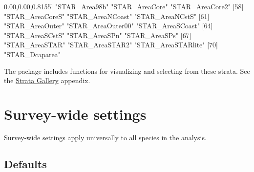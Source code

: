 \documentclass[
]{book}
\newenvironment{Shaded}{\begin{snugshade}}{\end{snugshade}}
\newcommand{\DecValTok}[1]{\textcolor[rgb]{0.00,0.00,0.81}{#1}}
\newcommand{\NormalTok}[1]{#1}
\newcommand{\StringTok}[1]{\textcolor[rgb]{0.31,0.60,0.02}{#1}}
\begin{document}
\begin{Shaded}
\begin{Highlighting}[]
\NormalTok{[}\DecValTok{55}\NormalTok{] }\StringTok{"STAR_Area98b"}       \StringTok{"STAR_AreaCore"}      \StringTok{"STAR_AreaCore2"}    
\NormalTok{[}\DecValTok{58}\NormalTok{] }\StringTok{"STAR_AreaCoreS"}     \StringTok{"STAR_AreaNCoast"}    \StringTok{"STAR_AreaNCstS"}    
\NormalTok{[}\DecValTok{61}\NormalTok{] }\StringTok{"STAR_AreaOuter"}     \StringTok{"STAR_AreaOuter00"}   \StringTok{"STAR_AreaSCoast"}   
\NormalTok{[}\DecValTok{64}\NormalTok{] }\StringTok{"STAR_AreaSCstS"}     \StringTok{"STAR_AreaSPn"}       \StringTok{"STAR_AreaSPs"}      
\NormalTok{[}\DecValTok{67}\NormalTok{] }\StringTok{"STAR_AreaSTAR"}      \StringTok{"STAR_AreaSTAR2"}     \StringTok{"STAR_AreaSTARlite"} 
\NormalTok{[}\DecValTok{70}\NormalTok{] }\StringTok{"STAR_Dcaparea"}     
\end{Highlighting}
\end{Shaded}

The package includes functions for visualizing and selecting from these strata. See the \protect\hyperlink{stratagallery}{Strata Gallery} appendix.

\hypertarget{survey-wide-settings}{%
\section*{Survey-wide settings}\label{survey-wide-settings}}

Survey-wide settings apply universally to all species in the analysis.

\hypertarget{defaults}{%
\subsection*{Defaults}\label{defaults}}
\end{document}
